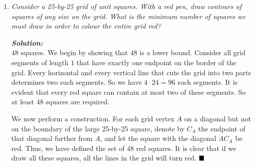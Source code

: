 \documentclass[12pt]{article}
\newcommand{\sol}[0]{\textbf{\textit{Solution:\\}}}
\begin{document}
\begin{enumerate}
\sol We have the following double implications.
\begin{align*}
& & a^{2}b^{2} + b^{2}c^{2} + c^{2}a^{2} + \frac{1}{3}(a^{2} + b^{2} + c^{2})^{2} &\geqslant \frac{1}{2}((ab + bc)^{2} + (bc + ca)^{2} + (ca + ab)^{2})\\
&\iff & \frac{1}{3}(a^{4} + b^{4} + c^{4}) + \frac{5}{3}(a^{2}b^{2} + b^{2}c^{2} + c^{2}a^{2}) &\geqslant (a^{2}b^{2} + b^{2}c^{2} + c^{2}a^{2}) + abc(a + b + c)\\
&\iff & a^{4} + b^{4} + c^{4} + 2(a^{2}b^{2} + b^{2}c^{2} + c^{2}a^{2}) &\geqslant 3abc(a + b + c)\\
&\iff & (a^{2} + b^{2} + c^{2})^{2} &\geqslant 3abc(a + b + c).
\end{align*}
The last statement is true since
\[\frac{1}{2}\left(\sum_{\textrm{sym}}a^{4}\right) + \left(\sum_{\textrm{sym}}a^{2}b^{2}\right) \geqslant \frac{1}{2}\left(\sum_{\textrm{sym}}a^{2}bc\right) + \left(\sum_{\textrm{sym}}a^{2}bc\right)\]
by Muirhead's inequality, or since, using \(x^{2} + y^{2} + z^{2} \geqslant xy + yz + zx\) twice,
\begin{align*}
&\mspace{24mu} (a^{2} + b^{2} + c^{2})^{2}\\
& \geqslant (ab + bc + ca)^{2}\\
& = (ab)^{2} + (bc)^{2} + (ca)^{2} + 2((ab)(bc) + (bc)(ca) + (ca)(ab))\\
& \geqslant (ab)(bc) + (bc)(ca) + (ca)(ab) + 2((ab)(bc) + (bc)(ca) + (ca)(ab))\\
& = 3abc(a + b + c).
\end{align*}
This completes the proof. $\hfill\blacksquare$


\item \textit{Consider a 25-by-25 grid of unit squares. With a red pen, draw contours of squares of any size on the grid. What is the minimum number of squares we must draw in order to colour the entire grid red?}

\sol $48$ squares. We begin by showing that $48$ is a lower bound. Consider all grid segments of length $1$ that have exactly one endpoint on the border of the grid. Every horizontal and every vertical line that cuts the grid into two parts determines two such segments. So we have $4 \cdot 24 = 96$ such segments. It is evident that every red square can contain at most two of these segments. So at least $48$ squares are required.

We now perform a construction. For each grid vertex $A$ on a diagonal but not on the boundary of the large 25-by-25 square, denote by $C_{A}$ the endpoint of that diagonal further from $A$, and let the square with the diagonal $AC_{A}$ be red. Thus, we have defined the set of $48$ red squares. It is clear that if we draw all these squares, all the lines in the grid will turn red. $\hfill\blacksquare$

\end{enumerate}
\end{document}
